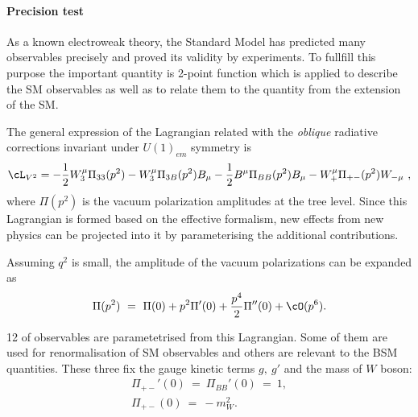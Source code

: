  
 \paragraph{Precision test}
 As a known electroweak theory, the Standard Model has predicted many observables precisely 
and proved its validity by experiments. To fullfill this purpose the important quantity is 2-point function 
which is applied to describe the SM observables as well as to relate them to the quantity 
from the extension of the SM.

The general expression of the Lagrangian related with the \emph{oblique} radiative corrections 
invariant under $U(1)_{em}$ symmetry is 
\begin{align}
 \cL_{V^2} = -\frac{1}{2}W_3^\mu \Pi_{33}(p^2) - W_3^\mu \Pi_{3B}(p^2) B_\mu 
 -\frac{1}{2} B^\mu \Pi_{BB}(p^2)B_\mu - W_+^{\mu}\Pi_{+-}(p^2)W_{-\mu}~, 
\end{align}
where $\Pi(p^2)$ is the vacuum polarization amplitudes at the tree level. 
Since this Lagrangian is formed based on the effective formalism, new effects from new physics
can be projected into it by parameterising the additional contributions.

 Assuming $q^2$ is small, the amplitude of the vacuum polarizations can be expanded as
 \begin{align}
  \Pi(p^2) ~=~\Pi(0)+p^2 \Pi'(0) + \frac{p^4}{2} \Pi''(0) + \cO(p^6). 
 \end{align}

 12 of observables are parametetrised from this Lagrangian. 
 Some of them are used for renormalisation of SM observables 
 and others are relevant to the BSM quantities.  
 These three fix the gauge kinetic terms $g,~g'$ and the mass of $W$ boson:
\begin{align}
 \Pi_{+-}'(0)~=~\Pi_{BB}'(0)~=~1, \nonumber\\
 \Pi_{+-}(0)~=~ -m_W^2 .
\end{align}

